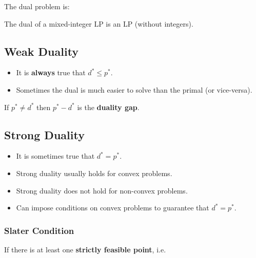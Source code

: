 \documentclass[8pt,a4paper]{scrartcl}
\begin{document}
\begin{multicols*}{3}
The dual problem is:


The dual of a mixed-integer LP is an LP (without integers).

\subsection{Weak Duality}

\begin{itemize}
\ncompaq
\item It is \textbf{always} true that $d^\ast\leq p^\ast$.
\item Sometimes the dual is much easier to solve than the primal (or vice-versa).
\end{itemize}

If $p^\ast\neq d^\ast$ then $p^\ast - d^\ast$ is the \textbf{duality gap}.

\subsection{Strong Duality}

\begin{itemize}
\ncompaq
\item It is sometimes true that $d^\ast = p^\ast$.
\item Strong duality usually holds for convex problems.
\item Strong duality does not hold for non-convex problems.
\item Can impose conditions on convex problems to guarantee that $d^\ast =p^\ast$.
\end{itemize}

\subsubsection{Slater Condition}


If there is at least one \textbf{strictly feasible point}, i.e.




\end{multicols*}
\end{document}
